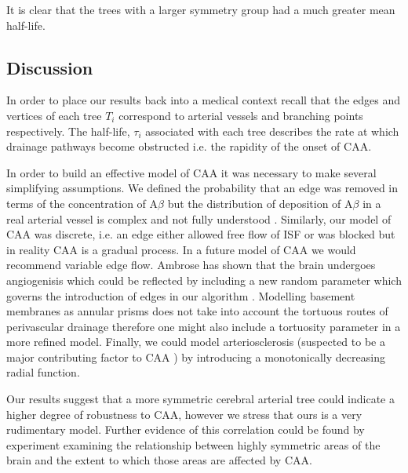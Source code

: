 \documentclass[12pt]{article} %
\theoremstyle{definition}
\begin{document}


It is clear that the trees with a larger symmetry group had a much greater mean half-life.

\subsection{Discussion}

In order to place our results back into a medical context recall that the edges and vertices of each tree $T_i$ correspond to arterial vessels and branching points respectively.  The half-life, $\tau_i$ associated with each tree describes the rate at which drainage pathways become obstructed i.e. the rapidity of the onset of CAA.  

In order to build an effective model of CAA it was necessary to make several simplifying assumptions.  We defined the probability that an edge was removed in terms of the concentration of A$\beta$ but the distribution of deposition of A$\beta$ in a real arterial vessel is complex and not fully understood \cite{yow}.  Similarly, our model of CAA was discrete, i.e. an edge either allowed free flow of ISF or was blocked but in reality CAA is a gradual process.  In a future model of CAA we would recommend variable edge flow. Ambrose has shown that the brain undergoes angiogenisis which could be reflected by including a new random parameter which governs the introduction of edges in our algorithm \cite{ambrose}.   Modelling basement membranes as annular prisms does not take into account the tortuous routes of perivascular drainage therefore one might also include a tortuosity parameter in a more refined model.  Finally, we could model arteriosclerosis (suspected to be a major contributing factor to CAA \cite{yow,
weller2002})  by 
introducing a monotonically decreasing radial function. 

 Our results suggest that a more symmetric cerebral arterial tree could indicate a higher degree of robustness to CAA, however we stress that ours is a very rudimentary model.  Further evidence of this correlation could be found by experiment examining the relationship between highly symmetric areas of the brain and the extent to which those areas are affected by CAA. 
\end{document}
